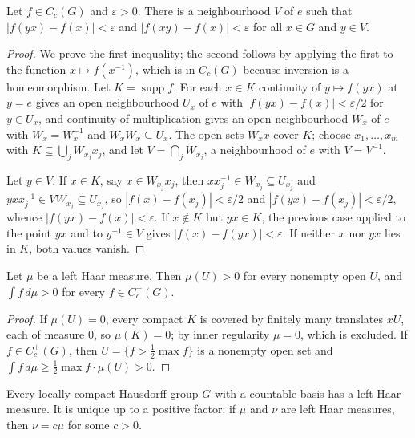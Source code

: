 \begin{lemma}\label{radon-measures:lemma-uniform-continuity}
Let $f \in C_c(G)$ and $\varepsilon > 0$. There is a neighbourhood $V$ of $e$ such that $|f(yx) - f(x)| < \varepsilon$ and $|f(xy) - f(x)| < \varepsilon$ for all $x \in G$ and $y \in V$.
\end{lemma}

\begin{proof}
We prove the first inequality; the second follows by applying the first to the function $x \mapsto f(x^{-1})$, which is in $C_c(G)$ because inversion is a homeomorphism. Let $K = \operatorname{supp}f$.
For each $x \in K$ continuity of $y \mapsto f(yx)$ at $y = e$ gives an open neighbourhood $U_x$ of $e$ with $|f(yx) - f(x)| < \varepsilon/2$ for $y \in U_x$, and continuity of multiplication gives an
open neighbourhood $W_x$ of $e$ with $W_x = W_x^{-1}$ and $W_xW_x \subseteq U_x$. The open sets $W_xx$ cover $K$; choose $x_1, \ldots, x_m$ with $K \subseteq \bigcup_jW_{x_j}x_j$, and let
$V = \bigcap_jW_{x_j}$, a neighbourhood of $e$ with $V = V^{-1}$.

Let $y \in V$. If $x \in K$, say $x \in W_{x_j}x_j$, then $xx_j^{-1} \in W_{x_j} \subseteq U_{x_j}$ and $yxx_j^{-1} \in VW_{x_j} \subseteq U_{x_j}$, so $|f(x) - f(x_j)| < \varepsilon/2$ and
$|f(yx) - f(x_j)| < \varepsilon/2$, whence $|f(yx) - f(x)| < \varepsilon$. If $x \notin K$ but $yx \in K$, the previous case applied to the point $yx$ and to $y^{-1} \in V$ gives
$|f(x) - f(yx)| < \varepsilon$. If neither $x$ nor $yx$ lies in $K$, both values vanish.
\end{proof}

\begin{lemma}\label{radon-measures:lemma-haar-positive}
Let $\mu$ be a left Haar measure. Then $\mu(U) > 0$ for every nonempty open $U$, and $\int f\,d\mu > 0$ for every $f \in C_c^+(G)$.
\end{lemma}

\begin{proof}
If $\mu(U) = 0$, every compact $K$ is covered by finitely many translates $xU$, each of measure $0$, so $\mu(K) = 0$; by inner regularity $\mu = 0$, which is excluded. If $f \in C_c^+(G)$, then
$U = \{f > \frac12\max f\}$ is a nonempty open set and $\int f\,d\mu \geq \frac12\max f\cdot\mu(U) > 0$.
\end{proof}

\begin{theorem}[Haar]\label{radon-measures:theorem-haar}
Every locally compact Hausdorff group $G$ with a countable basis has a left Haar measure. It is unique up to a positive factor: if $\mu$ and $\nu$ are left Haar measures, then $\nu = c\mu$ for some
$c > 0$.
\end{theorem}

